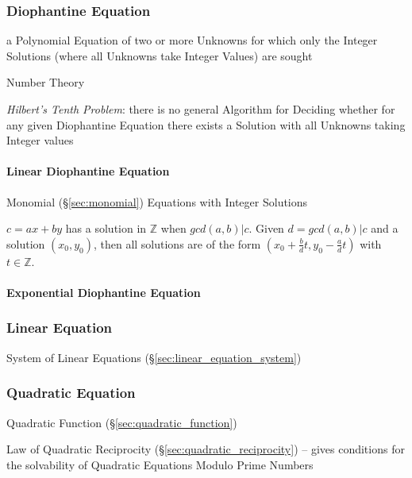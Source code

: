 \subsubsection{Diophantine Equation}\label{sec:diophantine_equation}

a Polynomial Equation of two or more Unknowns for which only the Integer
Solutions (where all Unknowns take Integer Values) are sought

\fist Number Theory

\emph{Hilbert's Tenth Problem}: there is no general Algorithm for Deciding
whether for any given Diophantine Equation there exists a Solution with all
Unknowns taking Integer values



\paragraph{Linear Diophantine Equation}
\label{sec:linear_diophantine}\hfill

Monomial (\S\ref{sec:monomial}) Equations with Integer Solutions

$c = ax + by$ has a solution in $\mathbb{Z}$ when $gcd(a,b)|c$. Given
$d=gcd(a,b)|c$ and a solution $(x_0, y_0)$, then all solutions are of
the form $(x_0 + \frac{b}{d}t, y_0 - \frac{a}{d}t)$ with $t \in
\mathbb{Z}$.



\paragraph{Exponential Diophantine Equation}\hfill
\label{sec:exponential_diophantine}



\subsubsection{Linear Equation}\label{sec:linear_equation}

System of Linear Equations (\S\ref{sec:linear_equation_system})



\subsubsection{Quadratic Equation}\label{sec:quadratic_equation}

Quadratic Function (\S\ref{sec:quadratic_function})

\fist Law of Quadratic Reciprocity (\S\ref{sec:quadratic_reciprocity}) -- gives
conditions for the solvability of Quadratic Equations Modulo Prime Numbers



